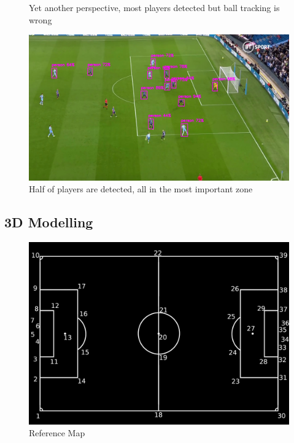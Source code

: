 \documentclass[
    11pt,
    oneside
]{report}
\begin{document}
\begin{appendices}
\begin{figure}[H]
    \caption{Yet another perspective, most players detected but ball tracking is wrong}
    \label{img:15}
\end{figure}
\begin{figure}[H]
    \includegraphics[keepaspectratio, width=\columnwidth]{Screenshot_2022-03-03_23-13-18.png}
    \caption{Half of players are detected, all in the most important zone}
    \label{img:16}
\end{figure}



\subsection{3D Modelling}



\begin{figure}[H]
    \includegraphics[keepaspectratio, width=\columnwidth]{coordinates.png}
    \caption{Reference Map}
    \label{img:ref_map}
\end{figure}


\end{appendices}
\end{document}
